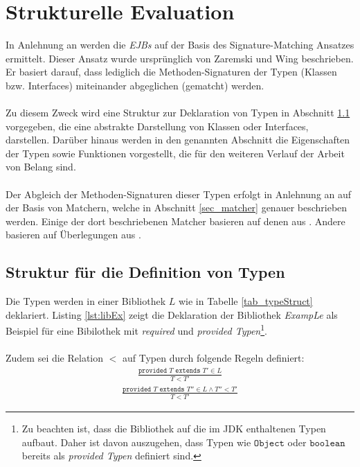 \section{Strukturelle Evaluation}
In Anlehnung an \cite{hummel08} werden die \emph{EJBs} auf der Basis des Signature-Matching Ansatzes ermittelt. Dieser Ansatz wurde ursprünglich von Zaremski und Wing \cite{moormann} beschrieben. Er basiert darauf, dass lediglich die Methoden-Signaturen der Typen (Klassen bzw. \Gls{Interface}s) miteinander abgeglichen (gematcht) werden. 
\\\\
Zu diesem Zweck wird eine Struktur zur Deklaration von Typen in Abschnitt \ref{sec:strukturTypen} vorgegeben, die eine abstrakte Darstellung von Klassen oder \Gls{Interface}s, darstellen. Darüber hinaus werden in den genannten Abschnitt die Eigenschaften der Typen sowie Funktionen vorgestellt, die für den weiteren Verlauf der Arbeit von Belang sind.
\\\\
Der Abgleich der Methoden-Signaturen dieser Typen erfolgt in Anlehnung an \cite{moormann} auf der Basis von Matchern, welche in Abschnitt \ref{sec_matcher} genauer beschrieben werden. Einige der dort beschriebenen Matcher basieren auf denen aus \cite{moormann}. Andere basieren auf Überlegungen aus \cite{hummel08}.
\subsection{Struktur für die Definition von Typen}\label{sec:strukturTypen}
Die Typen werden in einer Bibliothek $L$ wie in Tabelle \ref{tab_typeStruct} deklariert. Listing \ref{lst:libEx} zeigt die Deklaration der Bibliothek \emph{ExampLe} als Beispiel für eine Bibilothek mit \emph{required} und \emph{provided Typen}\footnote{Zu beachten ist, dass die Bibliothek auf die im JDK enthaltenen Typen aufbaut. Daher ist davon auszugehen, dass Typen wie $\texttt{Object}$ oder $\texttt{boolean}$ bereits als \emph{provided Typen} definiert sind.}.
\\\\
Zudem sei die Relation $<$ auf Typen durch folgende Regeln definiert:
\begin{gather*}
\frac{\texttt{provided }T \texttt{ extends } T' \in L}{T < T'}
\end{gather*}
\begin{gather*}
\frac{\texttt{provided } T \texttt{ extends } T'' \in L \wedge T'' < T'}{T < T'}
\end{gather*}
\noindent

